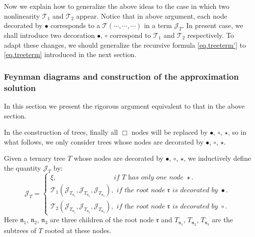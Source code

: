 Now we explain how to generalize the above ideas to the case in which two nonlinearity $\mathcal{T}_1$ and $\mathcal{T}_2$ appear.
Notice that in above argument, each node decorated by $\bullet$ corresponds to a $\mathcal{T}(\cdots,\cdots,\cdots)$ in a term $\mathcal{J}_{T}$. In present case, we shall introduce two decoration $\bullet$, $\circ$ correspond to $\mathcal{T}_1$ and $\mathcal{T}_2$ respectively. 
To adapt these changes, we should generalize the recursive formula \eqref{eq.treeterm'} to \eqref{eq.treeterm} introduced in the next section.


\subsubsection{Feynman diagrams and construction of the approximation solution} In this section we present the rigorous argument equivalent to that in the above section. 

In the construction of trees, finally all $\Box$ nodes will be replaced by $\bullet$, $\circ$, $\star$, so in what follows, we only consider trees whose nodes are decorated by $\bullet$, $\circ$, $\star$.

\begin{defn}\label{def.treeterms} Given a ternary tree $T$ whose nodes are decorated by $\bullet$, $\circ$, $\star$,
we inductively define the quantity $\mathcal{J}_T$ by:
\begin{equation}\label{eq.treeterm}
 \mathcal{J}_T=
 \begin{cases}
 \xi, \qquad\qquad\qquad\qquad \textit{ if }T\textit{ has only one node }\star.
 \\
 \mathcal{T}_1(\mathcal{J}_{T_{\mathfrak{n}_1}}, \mathcal{J}_{T_{\mathfrak{n}_2}}, \mathcal{J}_{T_{\mathfrak{n}_3}}), \textit{ if the root node }\mathfrak{r}\textit{ is decorated by }\bullet.
 \\
 \mathcal{T}_2(\mathcal{J}_{T_{\mathfrak{n}_1}}, \mathcal{J}_{T_{\mathfrak{n}_2}}, \mathcal{J}_{T_{\mathfrak{n}_3}}), \textit{ if the root node }\mathfrak{r}\textit{ is decorated by }\circ.
 \end{cases}
\end{equation}
Here $\mathfrak{n}_1$, $\mathfrak{n}_2$, $\mathfrak{n}_3$ are three children of the root node $\mathfrak{r}$ and $T_{\mathfrak{n}_1}$, $T_{\mathfrak{n}_2}$, $T_{\mathfrak{n}_3}$ are the subtrees of $T$ rooted at these nodes.
\end{defn}

